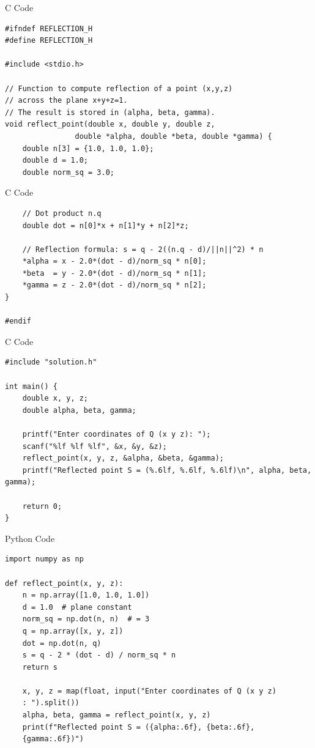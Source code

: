 \documentclass{beamer}
\begin{document}
\begin{frame}[fragile]{C Code}
    \begin{verbatim}
#ifndef REFLECTION_H
#define REFLECTION_H

#include <stdio.h>

// Function to compute reflection of a point (x,y,z)
// across the plane x+y+z=1.
// The result is stored in (alpha, beta, gamma).
void reflect_point(double x, double y, double z,
                double *alpha, double *beta, double *gamma) {
    double n[3] = {1.0, 1.0, 1.0};   
    double d = 1.0;                  
    double norm_sq = 3.0;
    \end{verbatim}
\end{frame}

\begin{frame}[fragile]{C Code}
    \begin{verbatim}
    // Dot product n.q
    double dot = n[0]*x + n[1]*y + n[2]*z;

    // Reflection formula: s = q - 2((n.q - d)/||n||^2) * n
    *alpha = x - 2.0*(dot - d)/norm_sq * n[0];
    *beta  = y - 2.0*(dot - d)/norm_sq * n[1];
    *gamma = z - 2.0*(dot - d)/norm_sq * n[2];
}

#endif
    \end{verbatim}
\end{frame}

\begin{frame}[fragile]{C Code}
    \begin{verbatim}
#include "solution.h"

int main() {
    double x, y, z;
    double alpha, beta, gamma;

    printf("Enter coordinates of Q (x y z): ");
    scanf("%lf %lf %lf", &x, &y, &z);
    reflect_point(x, y, z, &alpha, &beta, &gamma);
    printf("Reflected point S = (%.6lf, %.6lf, %.6lf)\n", alpha, beta, gamma);

    return 0;
}
    \end{verbatim}
\end{frame}

\begin{frame}[fragile]{Python Code}
    \begin{verbatim}
import numpy as np

def reflect_point(x, y, z):
    n = np.array([1.0, 1.0, 1.0])
    d = 1.0  # plane constant
    norm_sq = np.dot(n, n)  # = 3
    q = np.array([x, y, z])
    dot = np.dot(n, q)
    s = q - 2 * (dot - d) / norm_sq * n
    return s

    x, y, z = map(float, input("Enter coordinates of Q (x y z)
    : ").split())
    alpha, beta, gamma = reflect_point(x, y, z)
    print(f"Reflected point S = ({alpha:.6f}, {beta:.6f},
    {gamma:.6f})")
    \end{verbatim}
\end{frame}
\end{document}
